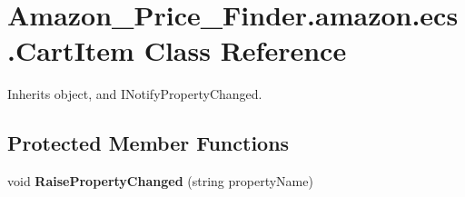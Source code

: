 \hypertarget{class_amazon___price___finder_1_1amazon_1_1ecs_1_1_cart_item}{\section{Amazon\-\_\-\-Price\-\_\-\-Finder.\-amazon.\-ecs.\-Cart\-Item Class Reference}
\label{class_amazon___price___finder_1_1amazon_1_1ecs_1_1_cart_item}
}


 




Inherits object, and I\-Notify\-Property\-Changed.

\subsection*{Protected Member Functions}
\begin{DoxyCompactItemize}
\item 
\hypertarget{class_amazon___price___finder_1_1amazon_1_1ecs_1_1_cart_item_a0a56e9f66b6a1f5ea1ec9553af82263e}{void {\bfseries Raise\-Property\-Changed} (string property\-Name)}\label{class_amazon___price___finder_1_1amazon_1_1ecs_1_1_cart_item_a0a56e9f66b6a1f5ea1ec9553af82263e}

\end{DoxyCompactItemize}
